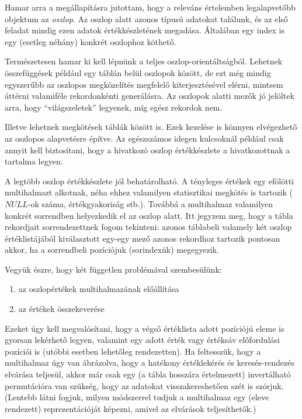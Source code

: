 \documentclass[
    parspace,
    noindent,
    nohyp,
]{elteiktdk}[2023/04/10]
\begin{document}
Hamar arra a megállapításra jutottam, hogy a releváns értelemben legalapvetőbb objektum
az \textit{oszlop}.
Az oszlop alatt azonos típusú adatokat találunk,
és az első feladat mindig ezen adatok értékkészletének megadása.
Általában egy index is egy (esetleg néhány) konkrét oszlophoz köthető.

Természetesen hamar ki kell lépnünk a teljes oszlop-orientáltságból.
Lehetnek összefüggések például egy táblán belül oszlopok között,
de ezt még mindig egyszerűbb az oszlopos megközelítés megfelelő kiterjesztésével elérni,
mintsem áttérni valamiféle rekordonkénti generálásra.
Az oszlopok alatti mezők jó jelöltek arra, hogy ``világszeletek'' legyenek,
míg egész rekordok nem.

Illetve lehetnek megkötések táblák között is.
Ezek kezelése is könnyen elvégezhető az oszlopos alapvetésre építve.
Az egészszámos idegen kulcsoknál például csak annyit kell biztosítani,
hogy a hivatkozó oszlop értékkészlete a hivatkozottnak a tartalma legyen.

A legtöbb oszlop értékkészlete jól behatárolható.
A tényleges értékek egy efölötti multihalmazt alkotnak,
néha ehhez valamilyen statisztikai megkötés is tartozik ($NULL$-ok száma, értékgyakoriság stb.).
Továbbá a multihalmaz valamilyen konkrét sorrendben helyezkedik el az oszlop alatt.
Itt jegyzem meg, hogy a tábla rekordjait sorrendezettnek fogom tekinteni:
azonos táblabeli valamely két oszlop értéklistájából kiválasztott egy-egy mező
azonos rekordhoz tartozik pontosan akkor, ha a sorrendbeli pozíciójuk (sorindexük) megegyezik.

Vegyük észre, hogy két független problémával szembesülünk:

\begin{enumerate}
    \item az oszlopértékek multihalmazának előállítása
    \item az értékek összekeverése
\end{enumerate}

Ezeket úgy kell megvalósítani, hogy a végső értéklista adott pozíciójú eleme is gyorsan lekérhető legyen,
valamint egy adott érték vagy értéksáv előfordulási pozíciói is
(utóbbi esetben lehetőleg rendezetten).
Ha feltesszük, hogy a multihalmaz úgy van ábrázolva,
hogy a hatékony értéklekérés és keresés-rendezés elvárása teljesül,
akkor már csak egy (a tábla hosszára értelmezett) invertálható permutációra van szükség,
hogy az adatokat visszakereshetően szét is szórjuk.
(Lentebb látni fogjuk, milyen módszerrel tudjuk a multihalmaz egy (eleve rendezett) reprezentációját képezni,
amivel az elvárások teljesíthetők.)
\end{document}
